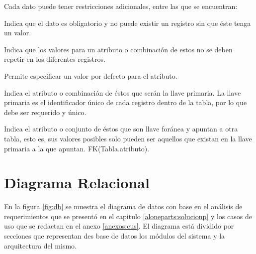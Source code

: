 Cada dato puede tener restricciones adicionales, entre las que se encuentran:
    
    \begin{bGlosario}
    
            Indica que el dato es obligatorio y no puede existir un registro sin que éste tenga
            un valor.
            
            Indica que los valores para un atributo o combinación de estos no se deben
            repetir en los diferentes registros.
            
            Permite especificar un valor por defecto para el atributo.
            
            Indica el atributo o combinación de éstos que serán la llave primaria. La llave
            primaria es el identificador único de cada registro dentro de la tabla, por lo
            que debe ser requerido y único.
            
            Indica el atributo o conjunto de éstos que son llave foránea y apuntan a otra
            tabla, esto es, sus valores posibles solo pueden ser aquellos que existan en la
            llave primaria a la que apuntan. FK(Tabla.atributo).

            
    \end{bGlosario}
    
\clearpage
\section{Diagrama Relacional}

En la figura \ref{fig:db} se muestra el diagrama de datos con base en el análisis de requerimientos que se presentó en el capitulo \ref{aloneparts:solucionp} y 
los casos de uso que se redactan en el anexo  \ref{anexos:cus}. El diagrama está dividido por secciones que representan des base de datos los módulos del sistema y la arquitectura del mismo.


